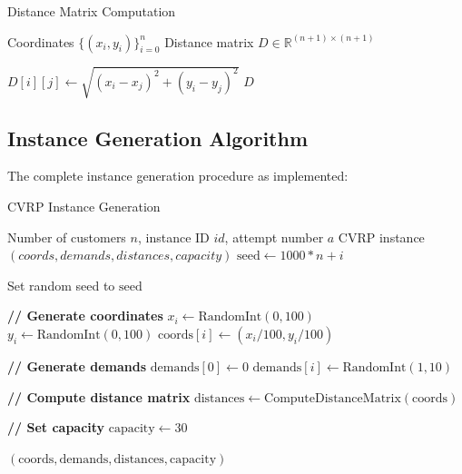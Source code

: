 \documentclass[a4paper,twoside]{article}
\begin{document}
\begin{algorithm}
\caption{Distance Matrix Computation}
\begin{algorithmic}[1]
\REQUIRE Coordinates $\{(x_i, y_i)\}_{i=0}^n$
\ENSURE Distance matrix $D \in \mathbb{R}^{(n+1) \times (n+1)}$

        \STATE $D[i][j] \leftarrow \sqrt{(x_i - x_j)^2 + (y_i - y_j)^2}$
    \ENDFOR
\ENDFOR
\RETURN $D$
\end{algorithmic}
\end{algorithm}

\subsection{Instance Generation Algorithm}

The complete instance generation procedure as implemented:

\begin{algorithm}
\caption{CVRP Instance Generation}
\begin{algorithmic}[1]
\REQUIRE Number of customers $n$, instance ID $id$, attempt number $a$
\ENSURE CVRP instance $(coords, demands, distances, capacity)$
\STATE $\text{seed} \leftarrow 1000 * n + i$


\STATE Set random seed to $\text{seed}$

\STATE \textbf{// Generate coordinates}
    \STATE $x_i \leftarrow \text{RandomInt}(0, 100)$
    \STATE $y_i \leftarrow \text{RandomInt}(0, 100)$
    \STATE $\text{coords}[i] \leftarrow (x_i/100, y_i/100)$
\ENDFOR

\STATE \textbf{// Generate demands}
\STATE $\text{demands}[0] \leftarrow 0$ 
    \STATE $\text{demands}[i] \leftarrow \text{RandomInt}(1, 10)$
\ENDFOR

\STATE \textbf{// Compute distance matrix}
\STATE $\text{distances} \leftarrow \text{ComputeDistanceMatrix}(\text{coords})$

\STATE \textbf{// Set capacity}
\STATE $\text{capacity} \leftarrow 30$

\RETURN $(\text{coords}, \text{demands}, \text{distances}, \text{capacity})$
\end{algorithmic}
\end{algorithm}
\end{document}

